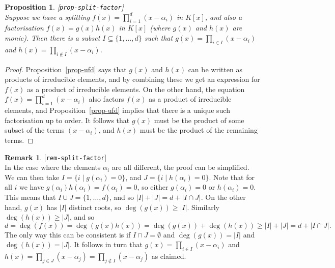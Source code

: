 \documentclass{amsart}
\newcommand{\lbl}[1]{\label{#1}\textup{[\texttt{#1}]}\ \\}
\newcommand{\lbl}{\label}
\newcommand{\al}        {\alpha}
\newcommand{\st}        {\;|\;}
\newcommand{\sse}       {\subseteq}
\renewcommand{\:}{\colon}
\newtheorem{proposition}[theorem]{Proposition}
\theoremstyle{definition}
\newtheorem{remark}[theorem]{Remark}
\begin{document}
\begin{proposition}\lbl{prop-split-factor}
 Suppose we have a splitting $f(x)=\prod_{i=1}^d(x-\al_i)$ in $K[x]$,
 and also a factorisation $f(x)=g(x)h(x)$ in $K[x]$ (where $g(x)$ and
 $h(x)$ are monic).  Then there is a subset $I\sse\{1,\dotsc,d\}$ such
 that $g(x)=\prod_{i\in I}(x-\al_i)$ and
 $h(x)=\prod_{i\not\in I}(x-\al_i)$.
\end{proposition}

\begin{proof}
 Proposition~\ref{prop-ufd} says that $g(x)$ and $h(x)$ can be written
 as products of irreducible elements, and by combining these we get an
 expression for $f(x)$ as a product of irreducible elements.  On the
 other hand, the equation $f(x)=\prod_{i=1}^d(x-\al_i)$ also factors
 $f(x)$ as a product of irreducible elements, and
 Proposition~\ref{prop-ufd} implies that there is a unique such
 factorisation up to order.  It follows that $g(x)$ must be the
 product of some subset of the terms $(x-\al_i)$, and $h(x)$ must be
 the product of the remaining terms.
\end{proof}

\begin{remark}\lbl{rem-split-factor}
 In the case where the elements $\al_i$ are all different, the proof
 can be simplified.  We can then take $I=\{i\st g(\al_i)=0\}$, and
 $J=\{i\st h(\al_i)=0\}$.  Note that for all $i$ we have
 $g(\al_i)h(\al_i)=f(\al_i)=0$, so either $g(\al_i)=0$ or
 $h(\al_i)=0$.  This means that $I\cup J=\{1,\dotsc,d\}$, and so
 $|I|+|J|=d+|I\cap J|$.  On the other hand, $g(x)$ has $|I|$ distinct
 roots, so $\deg(g(x))\geq |I|$.  Similarly $\deg(h(x))\geq |J|$, and
 so 
 \[ d=\deg(f(x))=\deg(g(x)h(x))=\deg(g(x))+\deg(h(x))\geq
      |I|+|J|=d+|I\cap J|.
 \]
 The only way this can be consistent is if $I\cap J=\emptyset$ and
 $\deg(g(x))=|I|$ and $\deg(h(x))=|J|$.  It follows in turn that
 $g(x)=\prod_{i\in I}(x-\al_i)$ and
 $h(x)=\prod_{j\in J}(x-\al_j)=\prod_{j\not\in I}(x-\al_j)$ as
 claimed. 
\end{remark}
\end{document}
